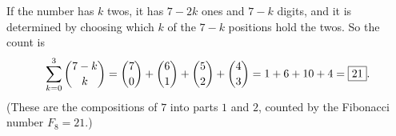 If the number has $k$ twos, it has $7-2k$ ones and $7-k$ digits, and it is determined by choosing which $k$ of the $7-k$ positions hold the twos. So the count is
\[
\sum_{k=0}^{3}\dbinom{7-k}{k}=\dbinom70+\dbinom61+\dbinom52+\dbinom43=1+6+10+4=\boxed{21}.
\]
(These are the compositions of $7$ into parts $1$ and $2$, counted by the Fibonacci number $F_8=21$.)
